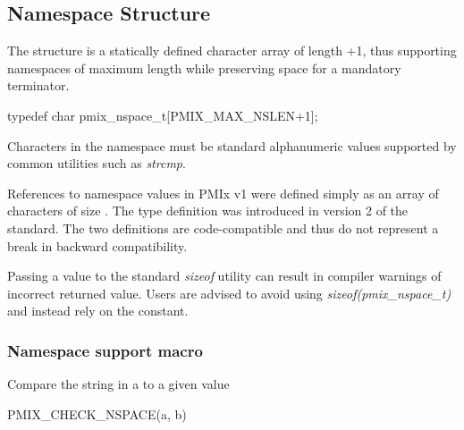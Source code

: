 \subsection{Namespace Structure}

The  structure is a statically defined character array of length +1, thus supporting namespaces of maximum length  while preserving space for a mandatory  terminator.

\cspecificstart
\begin{codepar}
typedef char pmix_nspace_t[PMIX_MAX_NSLEN+1];
\end{codepar}
\cspecificend

Characters in the namespace must be standard alphanumeric values supported by common utilities such as \textit{strcmp}.

\adviceuserstart
References to namespace values in \ac{PMIx} v1 were defined simply as an array of characters of size . The  type definition was introduced in version 2 of the standard. The two definitions are code-compatible and thus do not represent a break in backward compatibility.

Passing a  value to the standard \textit{sizeof} utility can result in compiler warnings of incorrect returned value. Users are advised to avoid using \textit{sizeof(pmix_nspace_t)} and instead rely on the  constant.
\adviceuserend

\subsubsection{Namespace support macro}

Compare the string in a  to a given value

\cspecificstart
\begin{codepar}
PMIX_CHECK_NSPACE(a, b)
\end{codepar}
\cspecificend

\begin{arglist}
\end{arglist}

